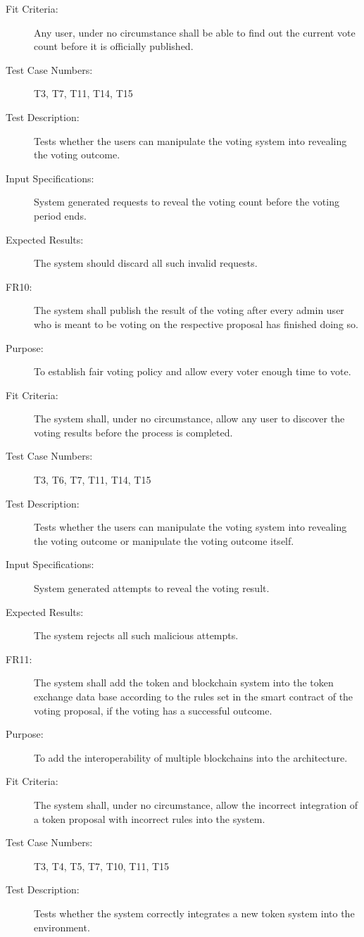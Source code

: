 \documentclass[a4paper,twoside,phd]{BYUPhys}
\begin{document}
\begin{description}
\item[Fit Criteria:] Any user, under no circumstance shall be able to find out the current vote count before it is officially published.
\item[Test Case Numbers:] T3, T7, T11, T14, T15
\item[Test Description:] Tests whether the users can manipulate the voting system into revealing the voting outcome.
\item[Input Specifications:] System generated requests to reveal the voting count before the voting period ends.
\item[Expected Results:] The system should discard all such invalid requests.
\\
\item[FR10:] The system shall publish the result of the voting after every admin user who is meant to be voting on the respective proposal has finished doing so.
\item[Purpose:] To establish fair voting policy and allow every voter enough time to vote.
\item[Fit Criteria:] The system shall, under no circumstance, allow any user to discover the voting results before the process is completed.
\item[Test Case Numbers:] T3, T6, T7, T11, T14, T15
\item[Test Description:] Tests whether the users can manipulate the voting system into revealing the voting outcome or manipulate the voting outcome itself.
\item[Input Specifications:] System generated attempts to reveal the voting result.
\item[Expected Results:] The system rejects all such malicious attempts.
\\
\item[FR11:] The system shall add the token and blockchain system into the token exchange data base according to the rules set in the smart contract of the voting proposal, if the voting has a successful outcome.
\item[Purpose:] To add the interoperability of multiple blockchains into the architecture.
\item[Fit Criteria:] The system shall, under no circumstance, allow the incorrect integration of a token proposal with incorrect rules into the system.
\item[Test Case Numbers:] T3, T4, T5, T7, T10, T11, T15
\item[Test Description:] Tests whether the system correctly integrates a new token system into the environment.

\end{description}
\end{document}
